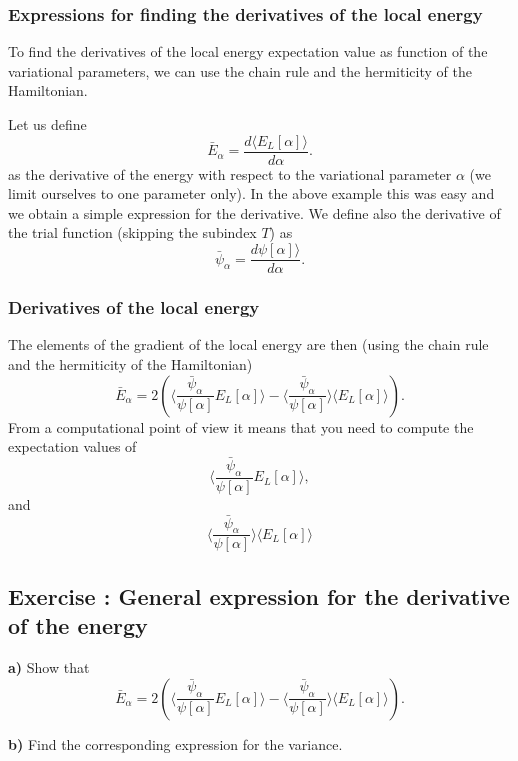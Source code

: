 \documentclass{beamer}
\newenvironment{doconceexercise}{}{}
\newcounter{doconceexercisecounter}
\newcounter{doconce:movie:counter}
\newcommand{\subex}[1]{\noindent\textbf{#1}}  %
\begin{document}
\begin{frame}
\frametitle{Expressions for finding the derivatives of the local energy}

\begin{block}{}

To find the derivatives of the local energy expectation value as function of the variational parameters, we can use the chain rule and the hermiticity of the Hamiltonian.  

Let us define 
\[
\bar{E}_{\alpha}=\frac{d\langle  E_L[\alpha]\rangle}{d\alpha}.
\]
as the derivative of the energy with respect to the variational parameter $\alpha$ (we limit ourselves to one parameter only).
In the above example this was easy and we obtain a simple expression for the derivative.
We define also the derivative of the trial function (skipping the subindex $T$) as 
\[
\bar{\psi}_{\alpha}=\frac{d\psi[\alpha]\rangle}{d\alpha}.
\]
\end{block}
\end{frame}

\begin{frame}
\frametitle{Derivatives of the local energy}

\begin{block}{}
The elements of the gradient of the local energy are then (using the chain rule and the hermiticity of the Hamiltonian)
\[
\bar{E}_{\alpha} = 2\left( \langle \frac{\bar{\psi}_{\alpha}}{\psi[\alpha]}E_L[\alpha]\rangle -\langle \frac{\bar{\psi}_{\alpha}}{\psi[\alpha]}\rangle\langle E_L[\alpha] \rangle\right).
\]
From a computational point of view it means that you need to compute the expectation values of 
\[
\langle \frac{\bar{\psi}_{\alpha}}{\psi[\alpha]}E_L[\alpha]\rangle,
\]
and
\[
\langle \frac{\bar{\psi}_{\alpha}}{\psi[\alpha]}\rangle\langle E_L[\alpha]\rangle
\]
\end{block}
\end{frame}

\begin{frame}

\begin{doconceexercise}

\subsection*{Exercise \thedoconceexercisecounter: General expression for the derivative of the energy}



\subex{a)}
Show that 
\[
\bar{E}_{\alpha} = 2\left( \langle \frac{\bar{\psi}_{\alpha}}{\psi[\alpha]}E_L[\alpha]\rangle -\langle \frac{\bar{\psi}_{\alpha}}{\psi[\alpha]}\rangle\langle E_L[\alpha] \rangle\right).
\]

\subex{b)}
Find the corresponding expression for the variance.


\end{doconceexercise}
\end{frame}
\end{document}
